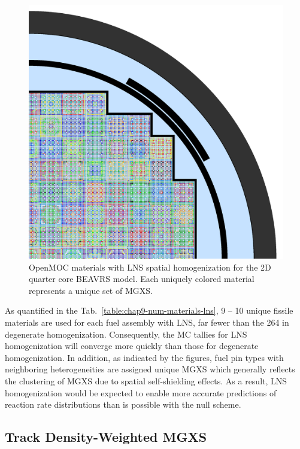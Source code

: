 \begin{figure}[h!]
\centering
\includegraphics[width=\linewidth]{figures/patterns/lns/full-core/materials}
\vspace{2mm}
\caption[Depiction of LNS spatially homogenized materials for BEAVRS]{OpenMOC materials with \ac{LNS} spatial homogenization for the 2D quarter core \ac{BEAVRS} model. Each uniquely colored material represents a unique set of \ac{MGXS}.}
\label{fig:chap9-lns-materials-beavrs}
\end{figure}

As quantified in the Tab.~\ref{table:chap9-num-materials-lns}, 9 -- 10 unique fissile materials are used for each fuel assembly with \ac{LNS}, far fewer than the 264 in degenerate homogenization. Consequently, the \ac{MC} tallies for \ac{LNS} homogenization will converge more quickly than those for degenerate homogenization. In addition, as indicated by the figures, fuel pin types with neighboring heterogeneities are assigned unique \ac{MGXS} which generally reflects the clustering of \ac{MGXS} due to spatial self-shielding effects. As a result, \ac{LNS} homogenization would be expected to enable more accurate predictions of reaction rate distributions than is possible with the null scheme. 

\subsection{Track Density-Weighted MGXS}
\label{subsec:chap9-lns-math}

